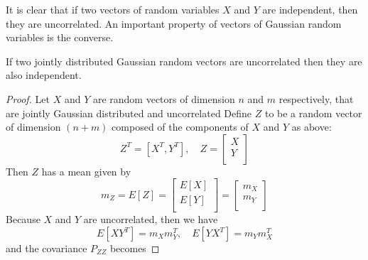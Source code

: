 It is clear that if two vectors of random variables $X$ and $Y$  are independent, then they are uncorrelated.  An important property of vectors of Gaussian random variables is the converse.
\begin{theorem}If two jointly distributed Gaussian random vectors are uncorrelated then they are also independent. \end{theorem}
\begin{proof}
Let $X$ and $Y$ are random vectors of dimension $n$ and $m$ respectively, that are jointly Gaussian distributed and uncorrelated
Define $Z$ to be a random vector of dimension $(n+m)$ composed of the components of $X$ and $Y$ as above:
$$Z^T = [X^T,Y^T], \quad Z = \left[
\begin{array}{c}
X \\
\hline
Y \\
\end{array}\right]$$
Then $Z$ has a mean given by 
$$m_Z = E[Z] 
= \left[\begin{array}{c}
E[X] \\
\hline
E[Y] \\
\end{array}\right]
= \left[\begin{array}{c}
m_X \\
\hline
m_Y\\
\end{array}\right]
$$
Because $X$ and $Y$ are uncorrelated, then we have 
$$E[XY^T] = m_Xm_Y^T, \quad E[YX^T] = m_Ym_X^T$$ and the covariance $P_{ZZ}$ becomes


\end{proof}
